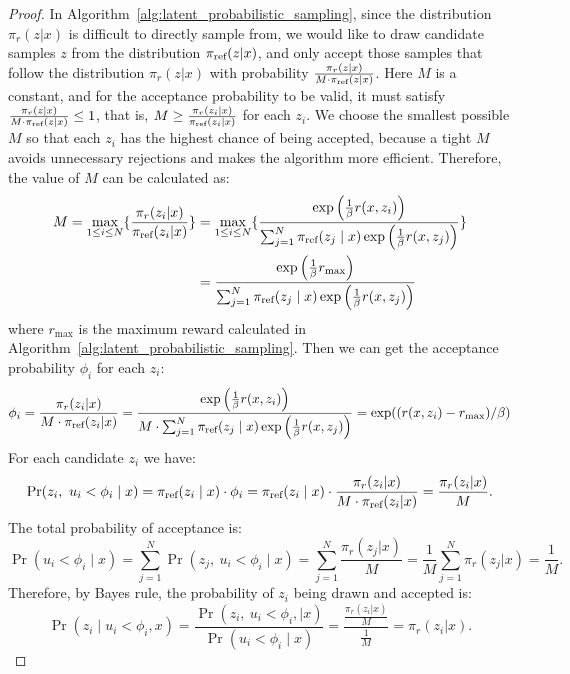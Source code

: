 \documentclass{article} %
\begin{document}
\begin{proof}
    In Algorithm~\ref{alg:latent_probabilistic_sampling}, since the distribution $\pi_{r}(z|x)$ is difficult to directly sample from, we would like to draw candidate samples $z$ from the distribution $\pi_\text{ref}(z|x)$, and only accept those samples that follow the distribution $\pi_{r}(z|x)$ with probability $\frac{\pi_{r}(z|x)}{M\cdot\pi_\text{ref}(z|x)}$. Here $M$ is a constant, and for the acceptance probability to be valid, it must satisfy $\frac{\pi_{r}(z|x)}{M\cdot\pi_\text{ref}(z|x)}\leq 1$, that is, $M\geq\frac{\pi_{r}(z_i|x)}{\pi_\text{ref}(z_i|x)}$ for each $z_i$. We choose the smallest possible $M$ so that each $z_i$ has the highest chance of being accepted, because a tight 
$M$ avoids unnecessary rejections and makes the algorithm more efficient. Therefore, the value of $M$ can be calculated as:
    \begin{align*}
  M=\max_{1\leq i\leq N}\{\frac{\pi_{r}(z_i|x)}{\pi_\text{ref}(z_i|x)}\}&=\max_{1\leq i\leq N}\{\frac{\exp\left(\frac{1}{\beta}r(x, z_i)\right)}{\sum^{N}_{j=1}\pi_\text{ref}(z_j\mid x)\exp\left(\frac{1}{\beta}r(x, z_j)\right)}\}\\&=\frac{\exp\left(\frac{1}{\beta}r_{\text{max}}\right)}{\sum^{N}_{j=1}\pi_\text{ref}(z_j\mid x)\exp\left(\frac{1}{\beta}r(x, z_j)\right)}
    \end{align*} where $r_{\text{max}}$ is the maximum reward calculated in Algorithm~\ref{alg:latent_probabilistic_sampling}. Then we can get the acceptance probability $\phi_i$ for each $z_i$:
    \begin{equation*}
    \phi_i=\frac{\pi_{r}(z_i|x)}{M\cdot\pi_\text{ref}(z_i|x)}=\frac{\exp\left(\frac{1}{\beta}r(x, z_i)\right)}{M\cdot\sum^{N}_{j=1}\pi_\text{ref}(z_j\mid x)\exp\left(\frac{1}{\beta}r(x, z_j)\right)}=\exp((r(x, z_i)-r_{\text{max}})/\beta)
  \end{equation*}
For each candidate $z_i$ we have:
\begin{equation*}
\Pr(z_i,\ u_i<\phi_i\mid x)
= \pi_\text{ref}(z_i\mid x)\cdot \phi_i
= \pi_\text{ref}(z_i\mid x)\cdot \frac{\pi_{r}(z_i|x)}{M\cdot\pi_\text{ref}(z_i|x)}
= \frac{\pi_{r}(z_i|x)}{M}.
\end{equation*}
The total probability of acceptance is:
\begin{equation*}
\Pr(u_i<\phi_i\mid x)
= \sum_{j=1}^N \Pr(z_j,\ u_i<\phi_i\mid x)
= \sum_{j=1}^N \frac{\pi_{r}(z_j|x)}{M}
= \frac{1}{M}\sum_{j=1}^N \pi_{r}(z_j|x)=\frac{1}{M}.
\end{equation*}
Therefore, by Bayes rule, the probability of $z_i$ being drawn and accepted is: 
\begin{equation*}
\Pr(z_i \mid u_i<\phi_i, x)
=\frac{\Pr(z_i,\ u_i<\phi_i,\mid x)}{\Pr(u_i<\phi_i\mid x)}= \frac{\frac{\pi_{r}(z_i|x)}{M}}{\frac{1}{M}}
= \pi_{r}(z_i|x).
\end{equation*}
\end{proof}
\end{document}
